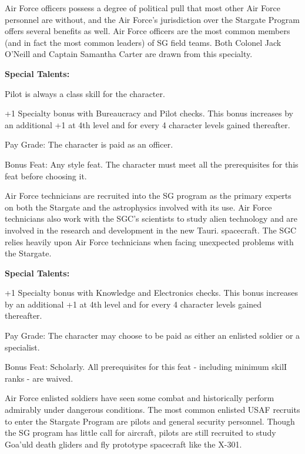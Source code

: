 Air Force officers possess a degree of political pull that most other Air Force personnel are without, and the Air Force's jurisdiction over the Stargate Program offers several benefits as well. Air Force officers are the most common members (and in fact the most common leaders) of SG field teams. Both Colonel Jack O'Neill and Captain Samantha Carter are drawn from this specialty.

\textbf{Special Talents:}
\begin{itemize*}
\item Pilot is always a class skill for the character.
\item +1 Specialty bonus with Bureaucracy and Pilot checks. This bonus increases by an additional +1 at 4th level and for every 4 character levels gained thereafter.
\item Pay Grade: The character is paid as an officer.
\item Bonus Feat: Any style feat. The character must meet all the prerequisites for this feat before choosing it.
\end{itemize*}

Air Force technicians are recruited into the SG program as the primary experts on both the Stargate and the astrophysics involved with its use. Air Force technicians also work with the SGC's scientists to study alien technology and are involved in the research and development in the new Tauri. spacecraft. The SGC relies heavily upon Air Force technicians when facing unexpected problems with the Stargate.

\textbf{Special Talents:}
\begin{itemize*}
\item +1 Specialty bonus with Knowledge and Electronics checks. This bonus increases by an additional +1 at 4th level and for every 4 character levels gained thereafter.
\item Pay Grade: The character may choose to be paid as either an enlisted soldier or a specialist.
\item Bonus Feat: Scholarly. All prerequisites for this feat - including minimum skilI ranks - are waived.
\end{itemize*}

Air Force enlisted soldiers have seen some combat and historically perform admirably under dangerous conditions. The most common enlisted USAF recruits to enter the Stargate Program are pilots and general security personnel. Though the SG program has little call for aircraft, pilots are still recruited to study Goa'uld death gliders and fly prototype spacecraft like the X-301.

